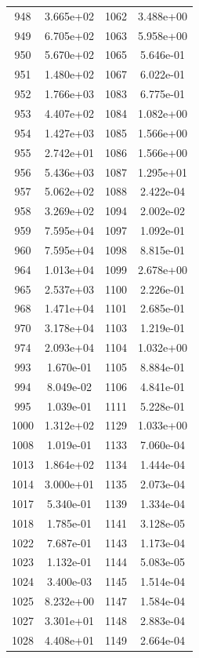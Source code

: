 \documentclass[12pt]{article}
\begin{document}
\begin{longtable}{@{}cccc@{}}
948 & 3.665e+02 & 1062 & 3.488e+00 \\
949 & 6.705e+02 & 1063 & 5.958e+00 \\
950 & 5.670e+02 & 1065 & 5.646e-01 \\
951 & 1.480e+02 & 1067 & 6.022e-01 \\
952 & 1.766e+03 & 1083 & 6.775e-01 \\
953 & 4.407e+02 & 1084 & 1.082e+00 \\
954 & 1.427e+03 & 1085 & 1.566e+00 \\
955 & 2.742e+01 & 1086 & 1.566e+00 \\
956 & 5.436e+03 & 1087 & 1.295e+01 \\
957 & 5.062e+02 & 1088 & 2.422e-04 \\
958 & 3.269e+02 & 1094 & 2.002e-02 \\
959 & 7.595e+04 & 1097 & 1.092e-01 \\
960 & 7.595e+04 & 1098 & 8.815e-01 \\
964 & 1.013e+04 & 1099 & 2.678e+00 \\
965 & 2.537e+03 & 1100 & 2.226e-01 \\
968 & 1.471e+04 & 1101 & 2.685e-01 \\
970 & 3.178e+04 & 1103 & 1.219e-01 \\
974 & 2.093e+04 & 1104 & 1.032e+00 \\
993 & 1.670e-01 & 1105 & 8.884e-01 \\
994 & 8.049e-02 & 1106 & 4.841e-01 \\
995 & 1.039e-01 & 1111 & 5.228e-01 \\
1000 & 1.312e+02 & 1129 & 1.033e+00 \\
1008 & 1.019e-01 & 1133 & 7.060e-04 \\
1013 & 1.864e+02 & 1134 & 1.444e-04 \\
1014 & 3.000e+01 & 1135 & 2.073e-04 \\
1017 & 5.340e-01 & 1139 & 1.334e-04 \\
1018 & 1.785e-01 & 1141 & 3.128e-05 \\
1022 & 7.687e-01 & 1143 & 1.173e-04 \\
1023 & 1.132e-01 & 1144 & 5.083e-05 \\
1024 & 3.400e-03 & 1145 & 1.514e-04 \\
1025 & 8.232e+00 & 1147 & 1.584e-04 \\
1027 & 3.301e+01 & 1148 & 2.883e-04 \\
1028 & 4.408e+01 & 1149 & 2.664e-04 \\

\bottomrule
\end{longtable}
\end{document}
